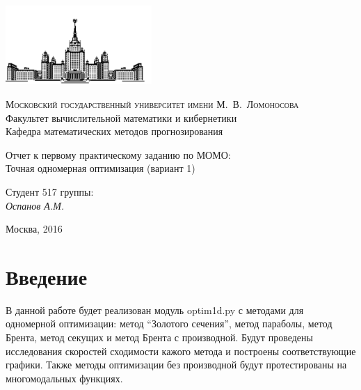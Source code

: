 \documentclass[12pt, a4paper]{article}
\begin{document}
    \thispagestyle{empty}

    \begin{singlespace}
    \begin{titlepage}
        \begin{center}
            \includegraphics[height = 3cm]{msu.png}

            {\scshape Московский государственный университет имени М.~В.~Ломоносова}\\
            Факультет вычислительной математики и кибернетики\\
            Кафедра математических методов прогнозирования\\
            \centerline{\hfill\hrulefill\hrulefill\hrulefill\hrulefill\hfill}

            \vfill

            {\LARGE Отчет к первому практическому заданию по МОМО: \\ Точная одномерная оптимизация (вариант 1)}

            \vspace{1cm}

        \end{center}

        \vfill
        \begin{flushright}
            Студент 517 группы:\\
                \textit{Оспанов А.М.}

            \vspace{5mm}

        \end{flushright}

        \vfill

        \begin{center}
        Москва, 2016
        \end{center}
    \end{titlepage}
    \end{singlespace}

    \newpage
    \section{Введение}
        В данной работе будет реализован модуль optim1d.py с методами для одномерной оптимизации: метод ``Золотого сечения'', метод параболы, метод Брента, метод секущих и метод Брента с производной. Будут проведены исследования скоростей сходимости кажого метода и построены соответствующие графики. Также методы оптимизации без производной будут протестированы на многомодальных функциях.
\end{document}
